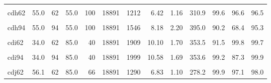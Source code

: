 \begin{landscape}
\begin{longtable}[t]{lrrrrrrrrrrrr}
\cellcolor{gray!6}{cdh46} & \cellcolor{gray!6}{55.0} & \cellcolor{gray!6}{46} & \cellcolor{gray!6}{55.0} & \cellcolor{gray!6}{100} & \cellcolor{gray!6}{18891} & \cellcolor{gray!6}{869} & \cellcolor{gray!6}{4.60} & \cellcolor{gray!6}{1.12} & \cellcolor{gray!6}{484.1} & \cellcolor{gray!6}{75.4} & \cellcolor{gray!6}{99.6} & \cellcolor{gray!6}{35.5}\\
cdh62 & 55.0 & 62 & 55.0 & 100 & 18891 & 1212 & 6.42 & 1.16 & 310.9 & 99.6 & 96.6 & 96.5\\
\cellcolor{gray!6}{cdh78} & \cellcolor{gray!6}{55.0} & \cellcolor{gray!6}{78} & \cellcolor{gray!6}{55.0} & \cellcolor{gray!6}{100} & \cellcolor{gray!6}{18891} & \cellcolor{gray!6}{1341} & \cellcolor{gray!6}{7.10} & \cellcolor{gray!6}{1.23} & \cellcolor{gray!6}{670.7} & \cellcolor{gray!6}{51.2} & \cellcolor{gray!6}{99.3} & \cellcolor{gray!6}{48.5}\\
cdh94 & 55.0 & 94 & 55.0 & 100 & 18891 & 1546 & 8.18 & 2.20 & 395.0 & 90.2 & 68.4 & 95.3\\
\cellcolor{gray!6}{cdi46} & \cellcolor{gray!6}{34.0} & \cellcolor{gray!6}{46} & \cellcolor{gray!6}{85.0} & \cellcolor{gray!6}{40} & \cellcolor{gray!6}{18891} & \cellcolor{gray!6}{1173} & \cellcolor{gray!6}{6.21} & \cellcolor{gray!6}{1.20} & \cellcolor{gray!6}{311.7} & \cellcolor{gray!6}{99.8} & \cellcolor{gray!6}{99.7} & \cellcolor{gray!6}{96.2}\\
cdi62 & 34.0 & 62 & 85.0 & 40 & 18891 & 1909 & 10.10 & 1.70 & 353.5 & 91.5 & 99.8 & 99.7\\
\cellcolor{gray!6}{cdi78} & \cellcolor{gray!6}{34.0} & \cellcolor{gray!6}{78} & \cellcolor{gray!6}{85.0} & \cellcolor{gray!6}{40} & \cellcolor{gray!6}{18891} & \cellcolor{gray!6}{2018} & \cellcolor{gray!6}{10.68} & \cellcolor{gray!6}{1.70} & \cellcolor{gray!6}{364.8} & \cellcolor{gray!6}{98.9} & \cellcolor{gray!6}{82.6} & \cellcolor{gray!6}{99.9}\\
cdi94 & 34.0 & 94 & 85.0 & 40 & 18891 & 1999 & 10.58 & 1.69 & 353.6 & 99.2 & 87.3 & 99.9\\
\cellcolor{gray!6}{cdj46} & \cellcolor{gray!6}{56.1} & \cellcolor{gray!6}{46} & \cellcolor{gray!6}{85.0} & \cellcolor{gray!6}{66} & \cellcolor{gray!6}{18891} & \cellcolor{gray!6}{1518} & \cellcolor{gray!6}{8.03} & \cellcolor{gray!6}{1.19} & \cellcolor{gray!6}{350.4} & \cellcolor{gray!6}{99.6} & \cellcolor{gray!6}{99.4} & \cellcolor{gray!6}{89.8}\\
cdj62 & 56.1 & 62 & 85.0 & 66 & 18891 & 1290 & 6.83 & 1.10 & 278.2 & 99.9 & 97.1 & 98.0\\

\end{longtable}
\end{landscape}

